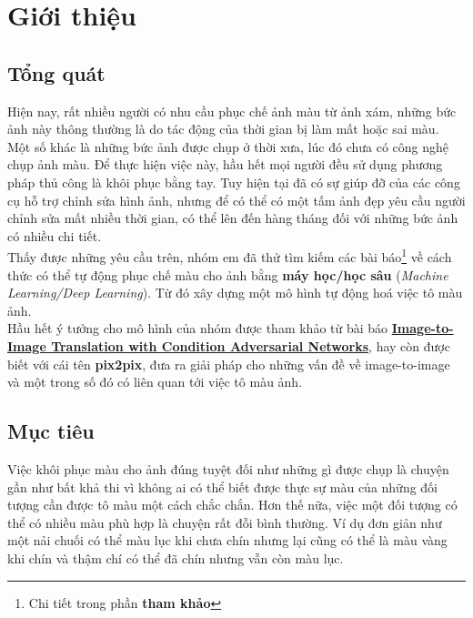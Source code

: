 \documentclass[a4paper]{article}
\begin{document}

\newpage

\tableofcontents

\newpage

\renewcommand{\listfigurename}{Danh sách hình minh hoạ}
\listoffigures

\newpage

\fancyfoot[R]{\scriptsize \ttfamily {\thepage}/\pageref{LastPage}}

\section{Giới thiệu}

\subsection{Tổng quát}
Hiện nay, rất nhiều người có nhu cầu phục chế ảnh màu từ ảnh xám, những bức ảnh này thông thường là do tác động của thời gian bị làm mất hoặc sai màu. Một số khác là những bức ảnh được chụp ở thời xưa, lúc đó chưa có công nghệ chụp ảnh màu. Để thực hiện việc này, hầu hết mọi người đều sử dụng phương pháp thủ công là khôi phục bằng tay. Tuy hiện tại đã có sự giúp đỡ của các công cụ hỗ trợ chỉnh sửa hình ảnh, nhưng để có thể có một tấm ảnh đẹp yêu cầu người chỉnh sửa  mất nhiều thời gian, có thể lên đến hàng tháng đối với những bức ảnh có nhiều chi tiết.\\

\noindent
Thấy được những yêu cầu trên, nhóm em đã thử tìm kiếm các bài báo\footnote{Chi tiết trong phần \textbf{ tham khảo}} về cách thức có thể tự động phục chế màu cho ảnh bằng \textbf{máy học/học sâu} (\textit{Machine Learning/Deep Learning}). Từ đó xây dựng một mô hình tự động hoá việc tô màu ảnh.\\
Hầu hết ý tưởng cho mô hình của nhóm được tham khảo từ bài báo \href{https://arxiv.org/abs/1611.07004}{\textbf{Image-to-Image Translation with Condition Adversarial Networks}}, hay còn được biết với cái tên \textbf{pix2pix}, đưa ra giải pháp cho những vấn đề về image-to-image và một trong số đó có liên quan tới việc tô màu ảnh. 

\subsection{Mục tiêu}\label{objective}
Việc khôi phục màu cho ảnh đúng tuyệt đối như những gì được chụp là chuyện gần như bất khả thi vì không ai có thể biết được thực sự màu của những đối tượng cần được tô màu một cách chắc chắn. Hơn thế nữa, việc một đối tượng có thể có nhiều màu phù hợp là chuyện rất đỗi bình thường. Ví dụ đơn giản như một nải chuối có thể màu lục khi chưa chín nhưng lại cũng có thể là màu vàng khi chín và thậm chí có thể đã chín nhưng vẫn còn màu lục.
\end{document}

